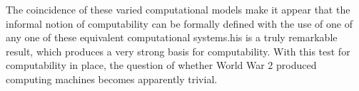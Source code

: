 \documentclass[Master.tex]{subfiles}
\begin{document}
The coincidence of these varied computational models make it appear that the informal notion of computability can be formally defined with the use of one of any one of these equivalent computational systems.his is a truly remarkable result, which produces a very strong basis for computability. With this test for computability in place, the question of whether World War 2 produced computing machines becomes apparently trivial.
\end{document}

